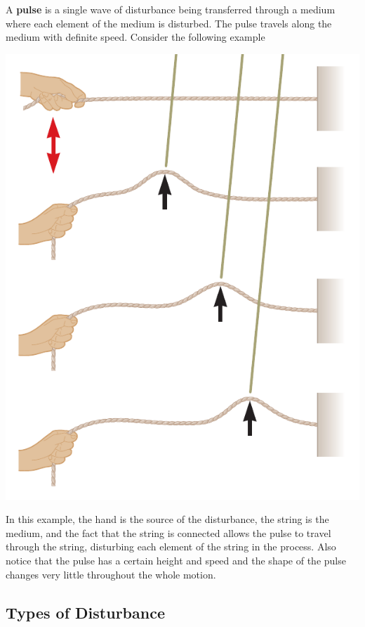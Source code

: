 A \textbf{pulse} is a single wave of disturbance being transferred through a medium where each element 
of the medium is disturbed. The pulse travels along the medium with definite speed.
Consider the following example
\begin{center}
    \includegraphics[scale=0.3]{images/oaw/pod01.png}
\end{center}

In this example, the hand is the source of the disturbance, the string is the medium, and the fact 
that the string is connected allows the pulse to travel through the string, disturbing each element 
of the string in the process. Also notice that the pulse has a certain height and speed and the 
shape of the pulse changes very little throughout the whole motion.

\subsection{Types of Disturbance}

